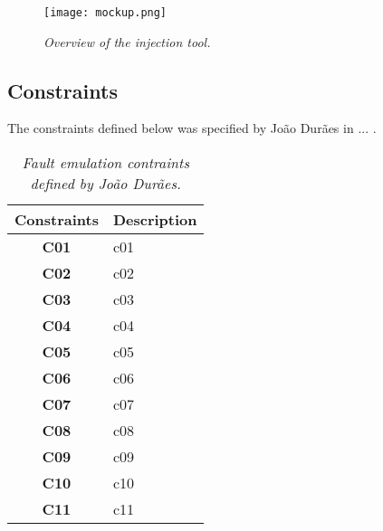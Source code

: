 \begin{figure}[!ht]
\begin{center}
\texttt{[image: mockup.png]}
\caption{\small \sl Overview of the injection tool.\label{fig:mockup}}
\end{center}
\end{figure}

\clearpage
\subsection{Constraints}

The constraints defined below was specified by João Durães in ... .

\begin{table}[!ht]
\centering
\begin{tabular}{|c|p{12cm}|}
\hline
\textbf{Constraints}            & \multicolumn{1}{c|}{\textbf{Description}}                                     \\ \hline \hline
\textbf{C01}         & \Acl{c01} \\ \hline
\textbf{C02}         & \Acl{c02} \\ \hline
\textbf{C03}         & \Acl{c03} \\ \hline
\textbf{C04}         & \Acl{c04} \\ \hline
\textbf{C05}         & \Acl{c05} \\ \hline
\textbf{C06}         & \Acl{c06} \\ \hline
\textbf{C07}         & \Acl{c07} \\ \hline
\textbf{C08}         & \Acl{c08} \\ \hline
\textbf{C09}         & \Acl{c09} \\ \hline
\textbf{C10}         & \Acl{c10} \\ \hline
\textbf{C11}         & \Acl{c11} \\ \hline
\end{tabular}
\caption{\small \sl Fault emulation contraints defined by João Durães.\label{tab:faultEmulationConstraintsDuraes}}
\end{table}


